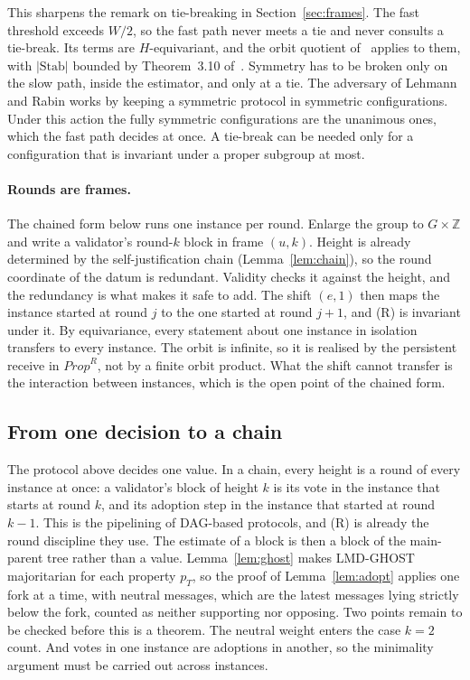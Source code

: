 \documentclass[11pt]{article}
\theoremstyle{definition}
\theoremstyle{remark}
\newcommand{\Stab}{\mathrm{Stab}}
\begin{document}
This sharpens the remark on tie-breaking in Section~\ref{sec:frames}. The
fast threshold exceeds $W/2$, so the fast path never meets a tie and never
consults a tie-break. Its terms are $H$-equivariant, and the orbit quotient
of~\cite[\S4]{oriented} applies to them, with $|\Stab|$ bounded by
Theorem~3.10 of~\cite{oriented}. Symmetry has to be broken only on the slow
path, inside the estimator, and only at a tie. The adversary of Lehmann and
Rabin works by keeping a symmetric protocol in symmetric configurations. Under
this action the fully symmetric configurations are the unanimous ones, which
the fast path decides at once. A tie-break can be needed only for a
configuration that is invariant under a proper subgroup at most.

\paragraph{Rounds are frames.}
The chained form below runs one instance per round. Enlarge the group to
$G\times\mathbb{Z}$ and write a validator's round-$k$ block in frame $(u,k)$.
Height is already determined by the self-justification chain
(Lemma~\ref{lem:chain}), so the round coordinate of the datum is redundant.
Validity checks it against the height, and the redundancy is what makes it
safe to add. The
shift $(e,1)$ then maps the instance started at round $j$ to the one started
at round $j+1$, and (R) is invariant under it. By equivariance, every statement
about one instance in isolation transfers to every instance. The orbit is
infinite, so it is realised by the persistent receive in
$\mathit{Prop}^R$, not by a finite orbit product. What the shift cannot
transfer is the interaction between instances, which is the open point of the
chained form.

\subsection{From one decision to a chain}

The protocol above decides one value. In a chain, every height is a round of
every instance at once: a validator's block of height $k$ is its vote in the
instance that starts at round $k$, and its adoption step in the instance that
started at round $k-1$. This is the pipelining of DAG-based protocols, and
(R) is already the round discipline they use. The estimate of a block is then a
block of the main-parent tree rather than a value. Lemma~\ref{lem:ghost} makes
LMD-GHOST majoritarian for each property $p_T$, so the proof of
Lemma~\ref{lem:adopt} applies one fork at a time, with neutral messages,
which are the latest messages lying strictly below the fork, counted as neither
supporting nor opposing. Two points remain to be checked before this is a
theorem. The neutral weight enters the case $k=2$ count. And votes in one
instance are adoptions in another, so the minimality argument must be carried
out across instances.
\end{document}
